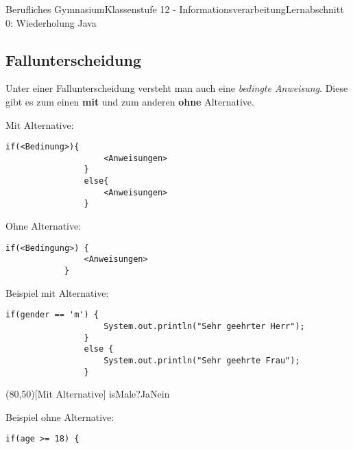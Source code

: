 \documentclass[11pt,oneside,openany,headings=optiontotoc,11pt,numbers=noenddot]{article}
\begin{document}
\begin{worksheet}{Berufliches Gymnasium}{Klassenstufe 12 - Informationsverarbeitung}{Lernabschnitt 0: Wiederholung Java}
		\subsection{Fallunterscheidung}
		Unter einer Fallunterscheidung versteht man auch eine \textit{bedingte Anweisung}. Diese gibt es zum einen \textbf{mit} und zum anderen \textbf{ohne} Alternative.\\
		\begin{minipage}[t]{0.48\textwidth}
			\vspace*{0pt}
			Mit Alternative:
			\begin{lstlisting}[style=JavaInputStyle]
				if(<Bedinung>){
					<Anweisungen>
				}
				else{
					<Anweisungen>
				}
			\end{lstlisting}
		\end{minipage}
		\hfill
		\begin{minipage}[t]{0.48\textwidth}
			\vspace*{0pt}
			Ohne Alternative:
			\begin{lstlisting}[style=JavaInputStyle]
			if(<Bedingung>) {
				<Anweisungen>
			}
			\end{lstlisting}
		\end{minipage}
		\par\noindent
		\begin{minipage}[t]{0.48\textwidth}
			\vspace*{0pt}
			Beispiel mit Alternative:
			\begin{lstlisting}[style=JavaInputStyle,frame=single]
				if(gender == 'm') {
					System.out.println("Sehr geehrter Herr");
				}
				else {
					System.out.println("Sehr geehrte Frau");
				}
			\end{lstlisting}
		\end{minipage}
		\hfill
		\begin{minipage}[t]{0.48\textwidth}
			\vspace*{0pt}
			\begin{struktogramm}(80,50)[Mit Alternative]
				{isMale?}{Ja}{Nein}
				\change
				\ifend
			\end{struktogramm}
		\end{minipage}
		\begin{minipage}[t]{0.48\textwidth}
			\vspace*{0pt}
			Beispiel ohne Alternative:
			\begin{lstlisting}[style=JavaInputStyle,frame=single]
			if(age >= 18) {

\end{lstlisting}
\end{minipage}
\end{worksheet}
\end{document}
